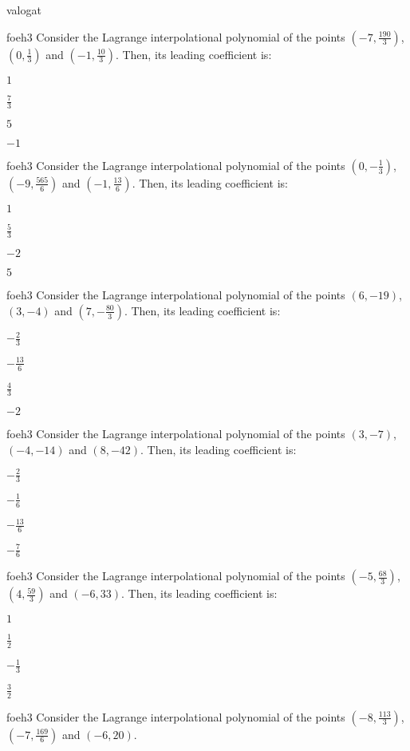 \documentclass[12pt]{article}
\begin{document}
\begin{quiz}{valogat}
\begin{multi}{foeh3}
Consider the Lagrange interpolational polynomial of the points $(-7,\frac{190}{3})$, $(0,\frac{1}{3})$ and $(-1,\frac{10}{3})$.
Then, its leading coefficient is:
\item* $ 1 $
\item  $ \frac{7}{3} $
\item  $ 5 $
\item  $ -1 $
\end{multi}
\begin{multi}{foeh3}
Consider the Lagrange interpolational polynomial of the points $(0,-\frac{1}{3})$, $(-9,\frac{565}{6})$ and $(-1,\frac{13}{6})$.
Then, its leading coefficient is:
\item* $ 1 $
\item  $ \frac{5}{3} $
\item  $ -2 $
\item  $ 5 $
\end{multi}
\begin{multi}{foeh3}
Consider the Lagrange interpolational polynomial of the points $(6,-19)$, $(3,-4)$ and $(7,-\frac{80}{3})$.
Then, its leading coefficient is:
\item* $ -\frac{2}{3} $
\item  $ -\frac{13}{6} $
\item  $ \frac{4}{3} $
\item  $ -2 $
\end{multi}
\begin{multi}{foeh3}
Consider the Lagrange interpolational polynomial of the points $(3,-7)$, $(-4,-14)$ and $(8,-42)$.
Then, its leading coefficient is:
\item* $ -\frac{2}{3} $
\item  $ -\frac{1}{6} $
\item  $ -\frac{13}{6} $
\item  $ -\frac{7}{6} $
\end{multi}
\begin{multi}{foeh3}
Consider the Lagrange interpolational polynomial of the points $(-5,\frac{68}{3})$, $(4,\frac{59}{3})$ and $(-6,33)$.
Then, its leading coefficient is:
\item* $ 1 $
\item  $ \frac{1}{2} $
\item  $ -\frac{1}{3} $
\item  $ \frac{3}{2} $
\end{multi}
\begin{multi}{foeh3}
Consider the Lagrange interpolational polynomial of the points $(-8,\frac{113}{3})$, $(-7,\frac{169}{6})$ and $(-6,20)$.

\end{multi}
\end{quiz}
\end{document}
